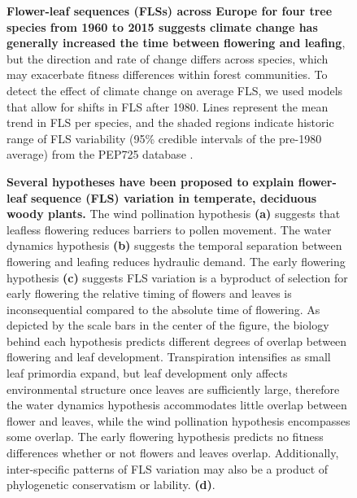 \documentclass[11pt]{article}
\begin{document}
\begin{figure}[h!]
    \centering
    \caption{\textbf{Flower-leaf sequences (FLSs) across Europe for four tree species from 1960 to 2015 suggests climate change has generally increased the time between flowering and leafing}, but the direction and rate of change differs across species, which may exacerbate fitness differences within forest communities. To detect the effect of climate change on average FLS, we used models that allow for shifts in FLS after 1980. Lines represent the mean trend in FLS per species, and the shaded regions indicate historic range of FLS variability (95\% credible intervals of the pre-1980 average) from the PEP725 database \citep{PEP725}.}
    \label{fig:climchange}
\end{figure}

\begin{figure}[h!]
    \centering
    \caption{\textbf{Several hypotheses have been proposed to explain flower-leaf sequence (FLS) variation in temperate, deciduous woody plants.}  The wind pollination hypothesis \textbf{(a)} suggests that leafless flowering reduces barriers to pollen movement. The water dynamics hypothesis \textbf{(b)} suggests the temporal separation between flowering and leafing reduces hydraulic demand. The early flowering hypothesis \textbf{(c)} suggests FLS variation is a byproduct of selection for early flowering the relative timing of flowers and leaves is inconsequential compared to the absolute time of flowering. As depicted by the scale bars in the center of the figure, the biology behind each hypothesis predicts different degrees of overlap between flowering and leaf development. Transpiration intensifies as small leaf primordia expand, but leaf development only affects environmental structure once leaves are sufficiently large, therefore the water dynamics hypothesis accommodates little overlap between flower and leaves, while the wind pollination hypothesis encompasses some overlap. The early flowering hypothesis predicts no fitness differences whether or not flowers and leaves overlap. Additionally, inter-specific patterns of FLS variation may also be a product of phylogenetic conservatism or lability. \textbf{(d)}.}
    \label{fig:conceptual}
\end{figure}
 
\end{document}

